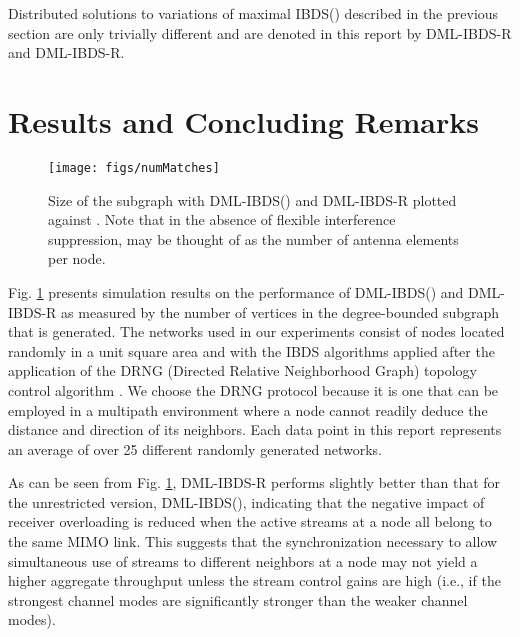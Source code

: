 \documentclass[journal,12pt,onecolumn]{IEEEtran}
\begin{document}
Distributed solutions to variations of
maximal IBDS() described in the previous section are only
trivially different and are denoted in this report
by DML-IBDS-R and DML-IBDS-R.

\section{Results and Concluding Remarks}
\label{sec:results}

\begin{figure}[!t]
\begin{center}
\texttt{[image: figs/numMatches]}
\caption{Size of the subgraph with DML-IBDS() and
  DML-IBDS-R plotted against . Note that in the 
  absence of flexible interference suppression,  may be thought
  of as the number of antenna elements per node.} 
\label{fig:numMatches}
\end{center}
\end{figure}

Fig.\,\,\ref{fig:numMatches} presents simulation results on the performance of
DML-IBDS() and DML-IBDS-R as measured by the number of
vertices in the degree-bounded subgraph that is generated. The networks used in 
our experiments consist of nodes located randomly in a unit square
area and with the IBDS algorithms applied after the application of the
DRNG (Directed Relative Neighborhood Graph) topology control algorithm
\cite{LiHou2005-1313}. We choose the DRNG protocol because it is one
that can be employed in a multipath environment where a node cannot
readily deduce the distance and direction of its neighbors. Each data
point in this report represents an average of over 25 different
randomly generated networks.

As can be seen from Fig.\,\,\ref{fig:numMatches}, DML-IBDS-R performs
slightly better than that for the unrestricted version, DML-IBDS(), indicating
that the negative impact of receiver overloading is reduced when the active streams at a node
all belong to the same MIMO link. This suggests that the synchronization necessary to
allow simultaneous use of streams to different neighbors at a node may
not yield a higher aggregate throughput unless the stream control
gains are high (i.e., if the strongest channel modes are significantly
stronger than the weaker channel modes).
\end{document}

